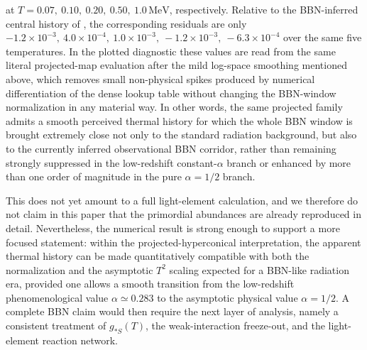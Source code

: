 \documentclass[11pt]{article}
\newcommand{\blue}[1]{{\color{blue}#1}}
\begin{document}
\blue{at $T=0.07,\ 0.10,\ 0.20,\ 0.50,\ 1.0\,\mathrm{MeV}$, respectively. Relative to the BBN-inferred central history of \cite{schoneberg2024bbn}, the corresponding residuals are only $-1.2\times10^{-3},\ 4.0\times10^{-4},\ 1.0\times10^{-3},\ -1.2\times10^{-3},\ -6.3\times10^{-4}$ over the same five temperatures. In the plotted diagnostic these values are read from the same literal projected-map evaluation after the mild log-space smoothing mentioned above, which removes small non-physical spikes produced by numerical differentiation of the dense lookup table without changing the BBN-window normalization in any material way. In other words, the same projected family admits a smooth perceived thermal history for which the whole BBN window is brought extremely close not only to the standard radiation background, but also to the currently inferred observational BBN corridor, rather than remaining strongly suppressed in the low-redshift constant-$\alpha$ branch or enhanced by more than one order of magnitude in the pure $\alpha=1/2$ branch.}

\blue{This does not yet amount to a full light-element calculation, and we therefore do not claim in this paper that the primordial abundances are already reproduced in detail. Nevertheless, the numerical result is strong enough to support a more focused statement: within the projected-hyperconical interpretation, the apparent thermal history can be made quantitatively compatible with both the normalization and the asymptotic $T^2$ scaling expected for a BBN-like radiation era, provided one allows a smooth transition from the low-redshift phenomenological value $\alpha\simeq0.283$ to the asymptotic physical value $\alpha=1/2$. A complete BBN claim would then require the next layer of analysis, namely a consistent treatment of $g_{*S}(T)$, the weak-interaction freeze-out, and the light-element reaction network.}
\end{document}
